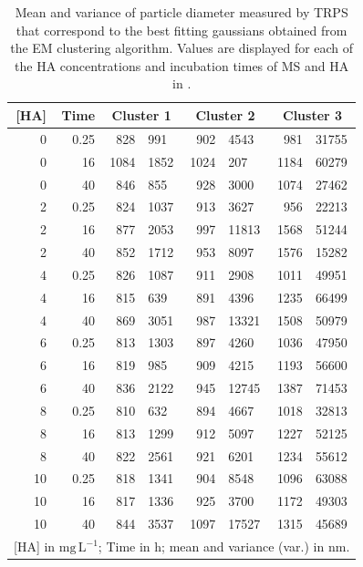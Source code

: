 \documentclass[journal=langd5,manuscript=article]{achemso}
\begin{document}
\begin{table}
\label{tbl:sizes}
\caption{Mean and variance of particle diameter measured by TRPS that correspond to the best fitting gaussians obtained from the EM clustering algorithm. Values are displayed for each of the HA concentrations and incubation times of MS and HA in .}
\begin{tabular}{r r  
r@{$\;\pm$}l  
r@{$\;\pm$}l  
r@{$\;\pm$}l }
[HA] &
Time & 
\multicolumn{2}{c}{Cluster 1}&
\multicolumn{2}{c}{Cluster 2}&
\multicolumn{2}{c}{Cluster 3} \\
\hline  %
   0     &  0.25     &   828     &   991     &   902     & 4543     &   981     & 31755    \\   
    0     &    16     &  1084     &  1852     &  1024     & 207     &  1184     & 60279    \\  
    0     &    40     &   846     &   855     &   928     & 3000     &  1074     & 27462    \\  
    2     &  0.25     &   824     &  1037     &   913     & 3627     &   956     & 22213    \\   
    2     &    16     &   877     &  2053     &   997     & 11813     &  1568     & 51244    \\  
    2     &    40     &   852     &  1712     &   953     &   8097    &   1576    & 15282     \\            
    4     &  0.25     &   826     &  1087     &   911     & 2908     &  1011     & 49951    \\  
    4     &    16     &   815     &   639     &   891     & 4396     &  1235     & 66499    \\  
    4     &    40     &   869     &  3051     &   987     & 13321     &  1508     & 50979    \\  
    6     &  0.25     &   813     &  1303     &   897     & 4260     &  1036     & 47950    \\  
    6     &    16     &   819     &   985     &   909     & 4215     &  1193     & 56600    \\  
    6     &    40     &   836     &  2122     &   945     & 12745     &  1387     & 71453    \\  
    8     &  0.25     &   810     &   632     &   894     & 4667     &  1018     & 32813    \\  
    8     &    16     &   813     &  1299     &   912     & 5097     &  1227     & 52125    \\  
    8     &    40     &   822     &  2561     &   921     & 6201     &  1234     & 55612    \\  
   10     &  0.25     &   818     &  1341     &   904     & 8548     &  1096     & 63088    \\  
   10     &    16     &   817     &  1336     &   925     & 3700     &  1172     & 49303    \\  
   10     &    40     &   844     &  3537     &  1097     & 17527     &  1315     & 45689    \\ 
\hline
\multicolumn{8}{l}{[HA] in $\mathrm{mg\,L^{-1}}$; Time in $\mathrm{h}$; mean and variance (var.) in $\mathrm{nm}$.} 
\end{tabular}
\end{table}
\end{document}
